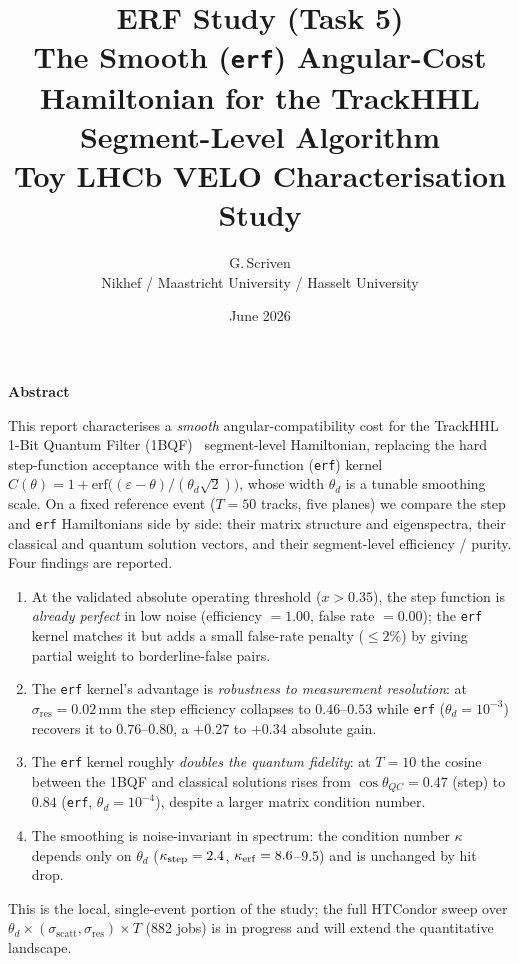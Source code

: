 \documentclass[11pt,a4paper]{article}
\title{%
  \textbf{ERF Study (Task 5)}\\[4pt]
  \large The Smooth (\texttt{erf}) Angular-Cost Hamiltonian for the
  TrackHHL Segment-Level Algorithm\\[2pt]
  \normalsize Toy LHCb VELO Characterisation Study}
\author{G.\,Scriven\\[2pt]
  \small Nikhef / Maastricht University / Hasselt University}
\date{June 2026}
\newcommand{\eps}{\varepsilon}
\newcommand{\thd}{\theta_d}
\newcommand{\sres}{\sigma_{\mathrm{res}}}
\newcommand{\sscat}{\sigma_{\mathrm{scatt}}}
\newcommand{\ntrk}{T}
\newcommand{\cosQC}{\cos\theta_{QC}}
\newenvironment{abstractbox}{%
  \setlength{\fboxsep}{8pt}%
  \begin{lrbox}{\abstractsavebox}%
  \begin{minipage}{0.86\linewidth}%
  \textbf{Abstract}\par\smallskip
}{%
  \end{minipage}%
  \end{lrbox}%
  \begin{center}\colorbox{gray!10}{\usebox{\abstractsavebox}}\end{center}%
}
\begin{document}
\maketitle
\thispagestyle{fancy}

\begin{abstractbox}
This report characterises a \emph{smooth} angular-compatibility cost for the TrackHHL
1-Bit Quantum Filter (1BQF)~\cite{onebqf} segment-level Hamiltonian, replacing the hard
step-function acceptance with the error-function (\texttt{erf}) kernel
$C(\theta)=1+\mathrm{erf}\!\big((\eps-\theta)/(\thd\sqrt2)\big)$, whose width $\thd$ is a
tunable smoothing scale. On a fixed reference event ($\ntrk=50$ tracks, five planes) we
compare the step and \texttt{erf} Hamiltonians side by side: their matrix structure and
eigenspectra, their classical and quantum solution vectors, and their segment-level
efficiency / purity. Four findings are reported.
\begin{enumerate}[noitemsep,topsep=2pt]
  \item At the validated absolute operating threshold ($x>0.35$), the step function is
        \emph{already perfect} in low noise (efficiency $=1.00$, false rate $=0.00$); the
        \texttt{erf} kernel matches it but adds a small false-rate penalty
        ($\le 2\%$) by giving partial weight to borderline-false pairs.
  \item The \texttt{erf} kernel's advantage is \emph{robustness to measurement
        resolution}: at $\sres=0.02\,\mathrm{mm}$ the step efficiency collapses to
        $0.46$--$0.53$ while \texttt{erf} ($\thd=10^{-3}$) recovers it to $0.76$--$0.80$,
        a $+0.27$ to $+0.34$ absolute gain.
  \item The \texttt{erf} kernel roughly \emph{doubles the quantum fidelity}: at
        $\ntrk=10$ the cosine between the 1BQF and classical solutions rises from
        $\cosQC=0.47$ (step) to $0.84$ (\texttt{erf}, $\thd=10^{-4}$), despite a larger
        matrix condition number.
  \item The smoothing is noise-invariant in spectrum: the condition number
        $\kappa$ depends only on $\thd$ ($\kappa_{\rm step}=2.4$,
        $\kappa_{\rm erf}=8.6$--$9.5$) and is unchanged by hit drop.
\end{enumerate}
This is the local, single-event portion of the study; the full HTCondor sweep over
$\thd\times(\sscat,\sres)\times\ntrk$ (882 jobs) is in progress and will extend the
quantitative landscape.
\end{abstractbox}
\end{document}
